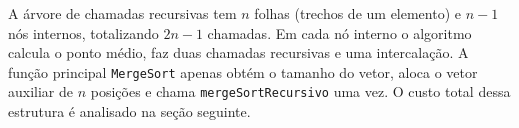 \begin{center}
\end{center}

\vspace{1cm} %

\qquad A árvore de chamadas recursivas tem $n$ folhas (trechos de um elemento) e $n - 1$ nós internos, totalizando $2n - 1$ chamadas. Em cada nó interno o algoritmo calcula o ponto médio, faz duas chamadas recursivas e uma intercalação. A função principal \texttt{MergeSort} apenas obtém o tamanho do vetor, aloca o vetor auxiliar de $n$ posições e chama \texttt{mergeSortRecursivo} uma vez. O custo total dessa estrutura é analisado na seção seguinte.